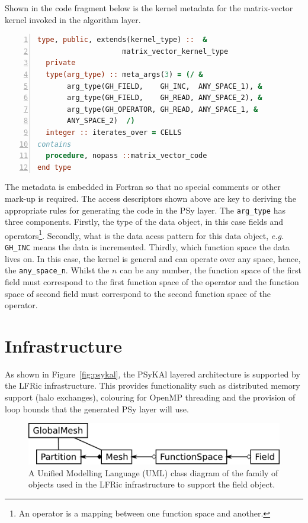 \documentclass[review,times]{elsarticle}
\begin{document}
Shown in the code fragment below is the kernel metadata for the
matrix-vector kernel invoked in the algorithm layer.
\begin{lstlisting}[language=Fortran, numbers=left,caption={Code
fragment showing kernel metadata for the matrix-vector operator kernel},label={lst:metadata}]
type, public, extends(kernel_type) ::  &
                    matrix_vector_kernel_type
  private
  type(arg_type) :: meta_args(3) = (/ &
       arg_type(GH_FIELD,    GH_INC,  ANY_SPACE_1), &
       arg_type(GH_FIELD,    GH_READ, ANY_SPACE_2), &
       arg_type(GH_OPERATOR, GH_READ, ANY_SPACE_1, &
       ANY_SPACE_2)  /)
  integer :: iterates_over = CELLS
contains
  procedure, nopass ::matrix_vector_code
end type
\end{lstlisting}
The metadata is embedded in Fortran so that no special comments or
other mark-up is required. The access descriptors shown above are key
to deriving the appropriate rules for generating the code in the PSy
layer. The \verb+arg_type+ has three components. Firstly, the type of
the data object, in this case fields and operators\footnote{An
  operator is a mapping between one function space and another.}. Secondly, what is
the data acess pattern for this data object, {\em e.g.} \verb+GH_INC+ means the data is
incremented. Thirdly, which function space the data lives on. In this case, the
kernel is general and can operate over any space, hence, the
\verb+any_space_n+. Whilst the $n$ can be any number, the function space of the
first field must correspond to the first function space of the operator and the
function space of second field must correspond to the second function
space of the operator. 


\section{\label{sec:lib}Infrastructure}

As shown in Figure~\ref{fig:psykal}, the PSyKAl layered
architecture is supported by the LFRic infrastructure. This provides
functionality such as distributed memory support (halo exchanges),
colouring for OpenMP threading and the provision of loop bounds that the
generated PSy layer will use.

\begin{figure}
\centering\includegraphics[width=0.8\linewidth]{Fig4_FieldClass.pdf}
\caption{\label{fig:objects} A Unified Modelling Language (UML) 
class diagram of the family of objects used
in the LFRic infrastructure to support the field object.}
\end{figure}
\end{document}
